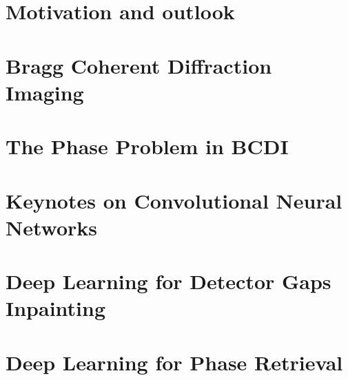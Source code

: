 \documentclass[12pt]{book}
\begin{document}
 \chapter{Motivation and outlook}
 \label{chap:introduction}
 

\fancyhead[RO]{\leftmark}
\fancyhead[LE]{\textsc{\chaptername~\thechapter}}

% 

\chapter{Bragg Coherent Diffraction Imaging}
\label{chap:bcdi}



\chapter{The Phase Problem in BCDI}
\label{chap:phase_problem}


% 

\chapter{Keynotes on Convolutional Neural Networks}
\label{chap:dl_theory}


\chapter{Deep Learning for Detector Gaps Inpainting}
\label{chap:inpainting}


\chapter{Deep Learning for Phase Retrieval}
\label{chap:phase_retrieval}

\end{document}
